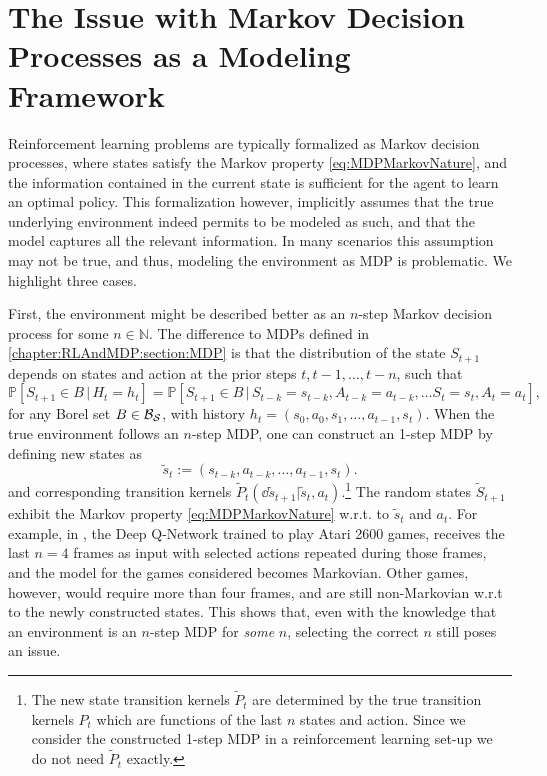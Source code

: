 \documentclass[
    a4paper,
    11pt,
    bibliography=totoc,
    listof=totoc,      
    headinclude=true,
    cleardoublepage=empty,
]{scrbook}
\theoremstyle{plain}
\theoremstyle{definition}
\theoremstyle{remark}
\newcommand{\SetN}{\mathbb N}
\newcommand{\PM}{\mathbb P}
\newcommand{\SpaceS}{{\cal S}}
\begin{document}
\section[The Issue with MDPs as a Modeling Framework]{The Issue with Markov Decision Processes as a Modeling Framework}
\label{chapter:RLAndMDP:section:IssueWithMDP}

Reinforcement learning problems are typically formalized as Markov decision
processes, where states satisfy the Markov property \eqref{eq:MDPMarkovNature},
and the information contained in the current state is sufficient for the agent 
to learn an optimal policy. This formalization however, implicitly assumes 
that the true underlying environment indeed permits to be modeled as such, 
and that the model captures all the relevant information. In many scenarios 
this assumption may not be true, and thus, modeling the environment as MDP is 
problematic. We highlight three cases.

First, the environment might be described better as an $n$-step Markov 
decision process for some $n\in\SetN$. The difference to MDPs defined in 
\cref{chapter:RLAndMDP:section:MDP} is that the distribution of the state 
$S_{t+1}$ depends on states and action at the prior steps $t, t-1, \dots, t-n$,
such that
\[
    \PM[S_{t+1}\in B \,|\,H_t = h_t] 
    = \PM[
        S_{t+1}\in B \,|\, S_{t-k}=s_{t-k}, A_{t-k}=a_{t-k}, 
            \dots S_t = s_t, A_t = a_t 
    ],
\]
for any Borel set $B\in\mathcal{B}_\SpaceS$, with history $h_t = (s_0, a_0, 
s_1,\dots, a_{t-1}, s_{t})$. When the true environment follows an $n$-step 
MDP, one can construct an 1-step MDP by defining new states as 
\[
    \tilde{s}_t := (s_{t-k}, a_{t-k}, \dots, a_{t-1}, s_t).
\]
and corresponding transition kernels $\tilde{P}_t(\dd{\tilde s_{t+1}}|
\tilde s_t, a_t)$.\footnote{
    The new state transition kernels $\tilde P_t$ are determined by the true
    transition kernels $P_t$ which are functions of the last $n$ states and
    action. Since we consider the constructed 1-step MDP in a reinforcement
    learning set-up we do not need  $\tilde P_t$ exactly.
}
The random states $\tilde{S}_{t+1}$ exhibit the Markov
property \eqref{eq:MDPMarkovNature} w.r.t. to $\tilde s_t$ and $a_t$. For 
example, in \cite{mnih2015_hctdrl}, the Deep Q-Network trained to
play Atari 2600 games, receives the last $n=4$ frames as input with selected
actions repeated during those frames, and the model for the games considered
becomes Markovian. Other games, however, would require more than four frames, 
and are still non-Markovian w.r.t to the newly constructed states. This shows 
that, even with the knowledge that an environment is an $n$-step MDP
for \textit{some} $n$, selecting the correct $n$ still poses an issue.
\end{document}
